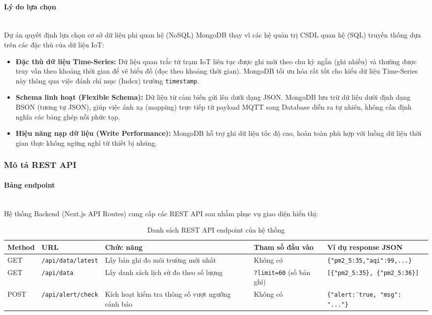 \documentclass[12pt,a4paper]{article}
\begin{document}
\paragraph{Lý do lựa chọn}\mbox{}\\
Dự án quyết định lựa chọn cơ sở dữ liệu phi quan hệ (NoSQL) MongoDB thay vì các hệ quản trị CSDL quan hệ (SQL) truyền thống dựa trên các đặc thù của dữ liệu IoT:
\begin{itemize}
    \item \textbf{Đặc thù dữ liệu Time-Series:} Dữ liệu quan trắc từ trạm IoT liên tục được ghi mới theo chu kỳ ngắn (ghi nhiều) và thường được truy vấn theo khoảng thời gian để vẽ biểu đồ (đọc theo khoảng thời gian). MongoDB tối ưu hóa rất tốt cho kiểu dữ liệu Time-Series này thông qua việc đánh chỉ mục (Index) trường \texttt{timestamp}.
    \item \textbf{Schema linh hoạt (Flexible Schema):} Dữ liệu từ cảm biến gửi lên dưới dạng JSON. MongoDB lưu trữ dữ liệu dưới định dạng BSON (tương tự JSON), giúp việc ánh xạ (mapping) trực tiếp từ payload MQTT sang Database diễn ra tự nhiên, không cần định nghĩa các bảng ghép nối phức tạp.
    \item \textbf{Hiệu năng nạp dữ liệu (Write Performance):} MongoDB hỗ trợ ghi dữ liệu tốc độ cao, hoàn toàn phù hợp với luồng dữ liệu thời gian thực không ngừng nghỉ từ thiết bị nhúng.
\end{itemize}

\subsubsection{Mô tả REST API}

\paragraph{Bảng endpoint}\mbox{}\\
Hệ thống Backend (Next.js API Routes) cung cấp các REST API sau nhằm phục vụ giao diện hiển thị:

\begin{table}[H]
\centering
\caption{Danh sách REST API endpoint của hệ thống}
\label{tab:rest_api}
\begin{tabularx}{\textwidth}{|l|l|>{\raggedright\arraybackslash}X|l|>{\raggedright\arraybackslash}X|}
\hline
\textbf{Method} & \textbf{URL} & \textbf{Chức năng} & \textbf{Tham số đầu vào} & \textbf{Ví dụ response JSON} \\ 
\hline
GET & \texttt{/api/data/latest} & Lấy bản ghi đo môi trường mới nhất & Không có & \texttt{\{"pm2\_5\":35,"aqi":99,...\}} \\ 
\hline
GET & \texttt{/api/data} & Lấy danh sách lịch sử đo theo số lượng & \texttt{?limit=60} (số bản ghi) & \texttt{[\{"pm2\_5\":35\}, \{"pm2\_5\":36\}]} \\ 
\hline
POST & \texttt{/api/alert/check} & Kích hoạt kiểm tra thông số vượt ngưỡng cảnh báo & Không có & \texttt{\{"alert\": true, "msg": "..."\}} \\ 
\hline
\end{tabularx}
\end{table}
\end{document}
